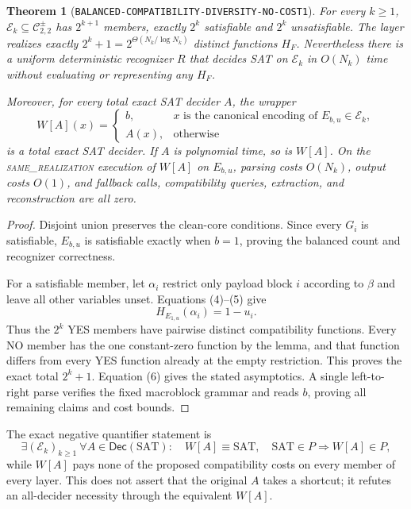\documentclass[11pt]{article}
\newtheorem{theorem}{Theorem}
\newcommand{\Core}{\mathcal C_{2,2}^{\pm}}
\newcommand{\same}{\textsc{same\_realization}}
\begin{document}
\begin{theorem}[\texttt{BALANCED-COMPATIBILITY-DIVERSITY-NO-COST1}]
For every \(k\ge1\), \(\mathcal E_k\subseteq\Core\) has \(2^{k+1}\) members,
exactly \(2^k\) satisfiable and \(2^k\) unsatisfiable.  The layer realizes
exactly \(2^k+1=2^{\Theta(N_k/\log N_k)}\) distinct functions \(H_F\).
Nevertheless there is a uniform deterministic recognizer \(R\) that decides
SAT on \(\mathcal E_k\) in \(O(N_k)\) time without evaluating or representing
any \(H_F\).

Moreover, for every total exact SAT decider \(A\), the wrapper
\[
 W[A](x)=
 \begin{cases}
 b,&x\text{ is the canonical encoding of }E_{b,u}\in\mathcal E_k,\\
 A(x),&\text{otherwise}
 \end{cases}                                                   \tag{7}
\]
is a total exact SAT decider.  If \(A\) is polynomial time, so is \(W[A]\).
On the \same{} execution of \(W[A]\) on \(E_{b,u}\), parsing costs \(O(N_k)\),
output costs \(O(1)\), and fallback calls, compatibility queries, extraction,
and reconstruction are all zero.
\end{theorem}

\begin{proof}
Disjoint union preserves the clean-core conditions.  Since every \(G_i\) is
satisfiable, \(E_{b,u}\) is satisfiable exactly when \(b=1\), proving the
balanced count and recognizer correctness.

For a satisfiable member, let \(\alpha_i\) restrict only payload block \(i\)
according to \(\beta\) and leave all other variables unset.  Equations (4)--(5)
give
\[
 H_{E_{1,u}}(\alpha_i)=1-u_i.                                \tag{8}
\]
Thus the \(2^k\) YES members have pairwise distinct compatibility functions.
Every NO member has the one constant-zero function by the lemma, and that
function differs from every YES function already at the empty restriction.
This proves the exact total \(2^k+1\).  Equation (6) gives the stated
asymptotics.  A single left-to-right parse verifies the fixed macroblock
grammar and reads \(b\), proving all remaining claims and cost bounds.
\end{proof}

The exact negative quantifier statement is
\[
 \exists(\mathcal E_k)_{k\ge1}\ \forall A\in\mathsf{Dec}(\mathrm{SAT}):
 \quad W[A]\equiv\mathrm{SAT},\quad
 \mathrm{SAT}\in P\Rightarrow W[A]\in P,                    \tag{9}
\]
while \(W[A]\) pays none of the proposed compatibility costs on every member
of every layer.  This does not assert that the original \(A\) takes a shortcut;
it refutes an all-decider necessity through the equivalent \(W[A]\).
\end{document}
